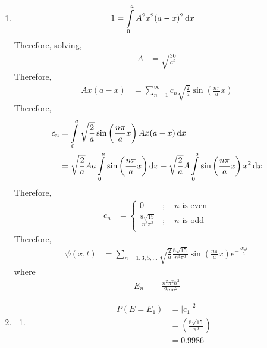 \documentclass[titlepage, fleqn, a4paper, 12pt, twoside]{article}
\theoremstyle{definition}
\theoremstyle{theorem}
\begin{document}
\begin{solution}
	\begin{enumerate}[leftmargin=*]
		\item
			\begin{align*}
				1 &= \int\limits_{0}^{a} A^2 x^2 (a - x)^2 \dif x
			\end{align*}
			Therefore, solving,
			\begin{align*}
				A &= \sqrt{\frac{30}{a^5}}
			\end{align*}
			Therefore,
			\begin{align*}
				A x (a - x) &= \sum\limits_{n = 1}^{\infty} c_n \sqrt{\frac{2}{a}} \sin\left( \frac{n \pi}{a} x \right)
			\end{align*}
			Therefore,
			\begin{align*}
				c_n &= \int\limits_{0}^{a} \sqrt{\frac{2}{a}} \sin\left( \frac{n \pi}{a} x \right) A x (a - x) \dif x\\
				&= \sqrt{\frac{2}{a}} A a \int\limits_{0}^{a} \sin\left( \frac{n \pi}{a} x \right) \dif x - \sqrt{\frac{2}{a}} A \int\limits_{0}^{a} \sin\left( \frac{n \pi}{a} x \right) x^2 \dif x\\
			\end{align*}
			Therefore,
			\begin{align*}
				c_n &=
					\begin{cases}
						0 &;\quad n \text{ is even}\\
						\frac{8 \sqrt{15}}{n^3 \pi^3} &;\quad n \text{ is odd}\\
					\end{cases}
			\end{align*}
			Therefore,
			\begin{align*}
				\psi(x,t) &= \sum\limits_{n = 1,3,5,\dots} \sqrt{\frac{2}{a}} \frac{8 \sqrt{15}}{n^3 \pi^3} \sin\left( \frac{n \pi}{a} x \right) e^{-\frac{i E_n t}{\hbar}}
			\end{align*}
			where
			\begin{align*}
				E_n &= \frac{n^2 \pi^2 \hbar^2}{2 m a^2}
			\end{align*}
		\item
			\begin{enumerate}[leftmargin=*]
				\item
					\begin{align*}
						P(E = E_1) &= |c_1|^2\\
						&= \left( \frac{8 \sqrt{15}}{\pi^3} \right)\\
						&= 0.9986
					\end{align*}

\end{enumerate}
\end{enumerate}
\end{solution}
\end{document}
